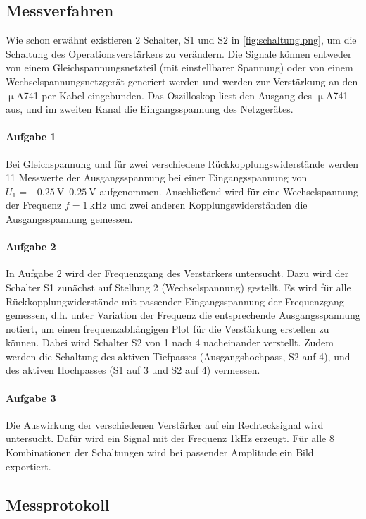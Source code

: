 \subsection{Messverfahren}
Wie schon erwähnt existieren 2 Schalter, S1 und S2 in \cref{fig:schaltung.png}, um die Schaltung des Operationsverstärkers zu verändern. Die Signale können entweder von einem Gleichspannungsnetzteil (mit einstellbarer Spannung) oder von einem Wechselspannungsnetzgerät generiert werden und werden zur Verstärkung an den \(\upmu\)A741 per Kabel eingebunden. Das Oszilloskop liest den Ausgang des \(\upmu\)A741 aus, und im zweiten Kanal die Eingangsspannung des Netzgerätes. 

\paragraph{Aufgabe 1}
Bei Gleichspannung und für zwei verschiedene Rückkopplungswiderstände werden 11 Messwerte der Ausgangsspannung bei einer Eingangsspannung von \(U_1=\qtyrange{-0.25}{0.25}{\volt}\) aufgenommen. Anschließend wird für eine Wechselspannung der Frequenz \(f=\qty{1}{\kilo\hertz}\) und zwei anderen Kopplungswiderständen die Ausgangsspannung gemessen. 
\paragraph{Aufgabe 2}
In Aufgabe 2 wird der Frequenzgang des Verstärkers untersucht. Dazu wird der Schalter S1 zunächst auf Stellung 2 (Wechselspannung) gestellt. Es wird für alle Rückkopplungwiderstände mit passender Eingangsspannung der Frequenzgang gemessen, d.h. unter Variation der Frequenz die entsprechende Ausgangsspannung notiert, um einen frequenzabhängigen Plot für die Verstärkung erstellen zu können. Dabei wird Schalter S2 von 1 nach 4 nacheinander verstellt. Zudem werden die Schaltung des aktiven Tiefpasses (Ausgangshochpass, S2 auf 4), und des aktiven Hochpasses (S1 auf 3 und S2 auf 4) vermessen. 
\paragraph{Aufgabe 3}
Die Auswirkung der verschiedenen Verstärker auf ein Rechtecksignal wird untersucht. Dafür wird ein Signal mit der Frequenz 1kHz erzeugt. Für alle 8 Kombinationen der Schaltungen wird bei passender Amplitude ein Bild exportiert.
\vfill
\subsection{Messprotokoll}

